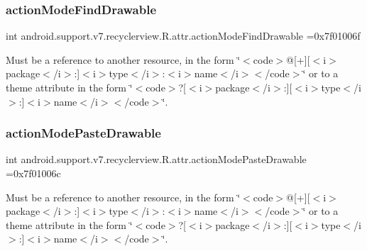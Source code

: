 \subsubsection{\texorpdfstring{action\+Mode\+Find\+Drawable}{actionModeFindDrawable}}
{\footnotesize\ttfamily int android.\+support.\+v7.\+recyclerview.\+R.\+attr.\+action\+Mode\+Find\+Drawable =0x7f01006f\hspace{0.3cm}{\ttfamily [static]}}

Must be a reference to another resource, in the form \char`\"{}$<$code$>$@\mbox{[}+\mbox{]}\mbox{[}$<$i$>$package$<$/i$>$\+:\mbox{]}$<$i$>$type$<$/i$>$\+:$<$i$>$name$<$/i$>$$<$/code$>$\char`\"{} or to a theme attribute in the form \char`\"{}$<$code$>$?\mbox{[}$<$i$>$package$<$/i$>$\+:\mbox{]}\mbox{[}$<$i$>$type$<$/i$>$\+:\mbox{]}$<$i$>$name$<$/i$>$$<$/code$>$\char`\"{}. \mbox{\label{classandroid_1_1support_1_1v7_1_1recyclerview_1_1R_1_1attr_a172ad20579ac450123e4beab92248343}} 
\subsubsection{\texorpdfstring{action\+Mode\+Paste\+Drawable}{actionModePasteDrawable}}
{\footnotesize\ttfamily int android.\+support.\+v7.\+recyclerview.\+R.\+attr.\+action\+Mode\+Paste\+Drawable =0x7f01006c\hspace{0.3cm}{\ttfamily [static]}}

Must be a reference to another resource, in the form \char`\"{}$<$code$>$@\mbox{[}+\mbox{]}\mbox{[}$<$i$>$package$<$/i$>$\+:\mbox{]}$<$i$>$type$<$/i$>$\+:$<$i$>$name$<$/i$>$$<$/code$>$\char`\"{} or to a theme attribute in the form \char`\"{}$<$code$>$?\mbox{[}$<$i$>$package$<$/i$>$\+:\mbox{]}\mbox{[}$<$i$>$type$<$/i$>$\+:\mbox{]}$<$i$>$name$<$/i$>$$<$/code$>$\char`\"{}. \mbox{\label{classandroid_1_1support_1_1v7_1_1recyclerview_1_1R_1_1attr_a8d543128e3202a6647a53ae79dd6bafa}} 
